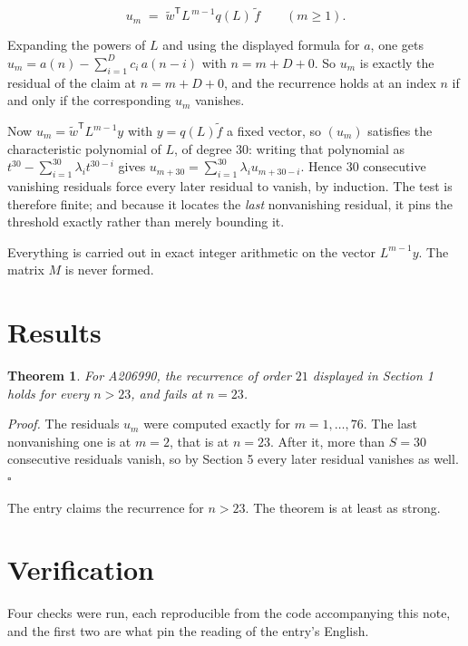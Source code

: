 \documentclass[11pt]{article}
\newtheorem{theorem}{Theorem}
\theoremstyle{definition}
\begin{document}
\[u_m \;=\; \tilde w^{\mathsf T} L^{\,m-1} q(L)\,\tilde f \qquad (m \ge 1).\]

Expanding the powers of $L$ and using the displayed formula for $a$, one gets $u_m = a(n) - \sum_{i=1}^{D} c_i\,a(n-i)$ with $n = m + D + 0$. So $u_m$ is exactly the residual of the claim at $n = m + D + 0$, and the recurrence holds at an index $n$ if and only if the corresponding $u_m$ vanishes.

Now $u_m = \tilde w^{\mathsf T} L^{m-1} y$ with $y = q(L)\tilde f$ a fixed vector, so $(u_m)$ satisfies the characteristic polynomial of $L$, of degree $30$: writing that polynomial as $t^{30} - \sum_{i=1}^{30} \lambda_i t^{30-i}$ gives $u_{m+30} = \sum_{i=1}^{30} \lambda_i u_{m+30-i}$. Hence $30$ consecutive vanishing residuals force every later residual to vanish, by induction. The test is therefore finite; and because it locates the {\itshape last} nonvanishing residual, it pins the threshold exactly rather than merely bounding it.

Everything is carried out in exact integer arithmetic on the vector $L^{m-1}y$. The matrix $M$ is never formed.

\section{Results}

\begin{theorem} For A206990, the recurrence of order $21$ displayed in Section 1 holds for every $n > 23$, and fails at $n = 23$.\end{theorem}

{\itshape Proof.} The residuals $u_m$ were computed exactly for $m = 1,\dots,76$. The last nonvanishing one is at $m = 2$, that is at $n = 23$. After it, more than $S = 30$ consecutive residuals vanish, so by Section 5 every later residual vanishes as well. $\square$

The entry claims the recurrence for $n > 23$. The theorem is at least as strong.

\section{Verification}

Four checks were run, each reproducible from the code accompanying this note, and the first two are what pin the reading of the entry's English.
\end{document}
